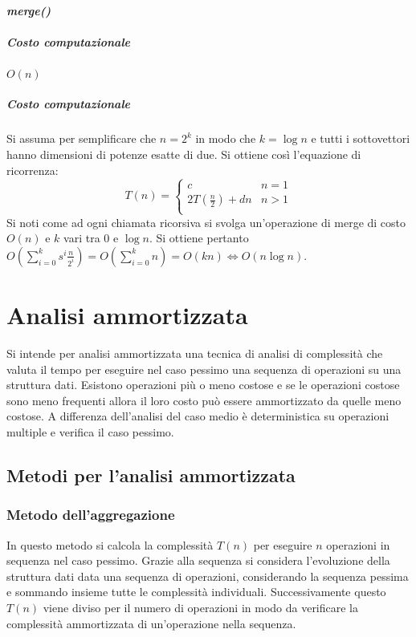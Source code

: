 \paragraph{\emph{merge()}}

\subparagraph{Costo computazionale} $O(n)$

\subparagraph{Costo computazionale} Si assuma per semplificare che $n = 2^k$ in modo che $k=\log n$ e tutti i sottovettori hanno dimensioni di potenze 
esatte di due. Si ottiene cos\`i l'equazione di ricorrenza:
\begin{equation*}
T(n)=\begin{cases}
c\quad\quad & n=1\\
2T(\frac{n}{2})+dn & n>1\\
\end{cases}
\end{equation*}
Si noti come ad ogni chiamata ricorsiva si svolga un'operazione di merge di costo $O(n)$ e $k$ vari tra $0$ e $\log n$. Si ottiene pertanto 
$O(\sum\limits_{i=0}^ks^i\frac{n}{2^i})=O(\sum\limits_{i=0}^kn)=O(kn)\Leftrightarrow O(n\log n)$. 
\section{Analisi ammortizzata}
Si intende per analisi ammortizzata una tecnica di analisi di complessit\`a che valuta il tempo per eseguire nel caso pessimo una sequenza di operazioni 
su una struttura dati. Esistono operazioni pi\`u o meno costose e se le operazioni costose sono meno frequenti allora il loro costo pu\`o essere 
ammortizzato da quelle meno costose. A differenza dell'analisi del caso medio \`e deterministica su operazioni multiple e verifica il caso pessimo.
\subsection{Metodi per l'analisi ammortizzata}
\subsubsection{Metodo dell'aggregazione}
In questo metodo si calcola la complessit\`a $T(n)$ per eseguire $n$ operazioni in sequenza nel caso pessimo. Grazie alla sequenza si considera l'evoluzione
della struttura dati data una sequenza di operazioni, considerando la sequenza pessima e sommando insieme tutte le complessit\`a individuali. 
Successivamente questo $T(n)$ viene diviso per il numero di operazioni in modo da verificare la complessit\`a ammortizzata di un'operazione nella sequenza.
